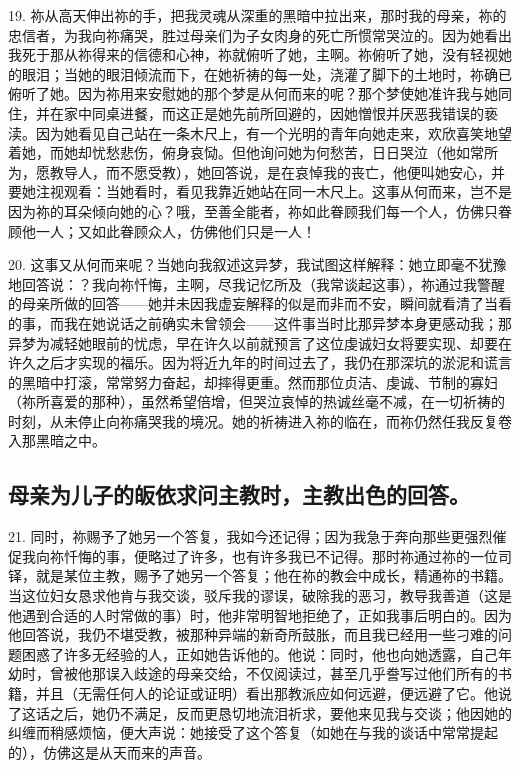 19. 祢从高天伸出祢的手，把我灵魂从深重的黑暗中拉出来，那时我的母亲，祢的忠信者，为我向祢痛哭，胜过母亲们为子女肉身的死亡所惯常哭泣的。因为她看出我死于那从祢得来的信德和心神，祢就俯听了她，主啊。祢俯听了她，没有轻视她的眼泪；当她的眼泪倾流而下，在她祈祷的每一处，浇灌了脚下的土地时，祢确已俯听了她。因为祢用来安慰她的那个梦是从何而来的呢？那个梦使她准许我与她同住，并在家中同桌进餐，而这正是她先前所回避的，因她憎恨并厌恶我错误的亵渎。因为她看见自己站在一条木尺上，有一个光明的青年向她走来，欢欣喜笑地望着她，而她却忧愁悲伤，俯身哀恸。但他询问她为何愁苦，日日哭泣（他如常所为，愿教导人，而不愿受教），她回答说，是在哀悼我的丧亡，他便叫她安心，并要她注视观看：当她看时，看见我靠近她站在同一木尺上。这事从何而来，岂不是因为祢的耳朵倾向她的心？哦，至善全能者，祢如此眷顾我们每一个人，仿佛只眷顾他一人；又如此眷顾众人，仿佛他们只是一人！\par

20. 这事又从何而来呢？当她向我叙述这异梦，我试图这样解释：她立即毫不犹豫地回答说：？我向祢忏悔，主啊，尽我记忆所及（我常谈起这事），祢通过我警醒的母亲所做的回答——她并未因我虚妄解释的似是而非而不安，瞬间就看清了当看的事，而我在她说话之前确实未曾领会——这件事当时比那异梦本身更感动我；那异梦为减轻她眼前的忧虑，早在许久以前就预言了这位虔诚妇女将要实现、却要在许久之后才实现的福乐。因为将近九年的时间过去了，我仍在那深坑的淤泥和谎言的黑暗中打滚，常常努力奋起，却摔得更重。然而那位贞洁、虔诚、节制的寡妇（祢所喜爱的那种），虽然希望倍增，但哭泣哀悼的热诚丝毫不减，在一切祈祷的时刻，从未停止向祢痛哭我的境况。她的祈祷进入祢的临在，而祢仍然任我反复卷入那黑暗之中。\par


\subsection{母亲为儿子的皈依求问主教时，主教出色的回答。}

21. 同时，祢赐予了她另一个答复，我如今还记得；因为我急于奔向那些更强烈催促我向祢忏悔的事，便略过了许多，也有许多我已不记得。那时祢通过祢的一位司铎，就是某位主教，赐予了她另一个答复；他在祢的教会中成长，精通祢的书籍。当这位妇女恳求他肯与我交谈，驳斥我的谬误，破除我的恶习，教导我善道（这是他遇到合适的人时常做的事）时，他非常明智地拒绝了，正如我事后明白的。因为他回答说，我仍不堪受教，被那种异端的新奇所鼓胀，而且我已经用一些刁难的问题困惑了许多无经验的人，正如她告诉他的。他说：同时，他也向她透露，自己年幼时，曾被他那误入歧途的母亲交给，不仅阅读过，甚至几乎誊写过他们所有的书籍，并且（无需任何人的论证或证明）看出那教派应如何远避，便远避了它。他说了这话之后，她仍不满足，反而更恳切地流泪祈求，要他来见我与交谈；他因她的纠缠而稍感烦恼，便大声说：她接受了这个答复（如她在与我的谈话中常常提起的），仿佛这是从天而来的声音。\par

